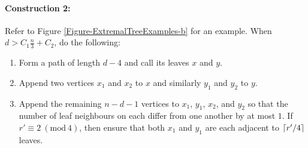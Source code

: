 \documentclass[12]{article}
\newcommand{\Mod}[1]{\ (\mathrm{mod}\ #1)}
\DeclarePairedDelimiter\ceil{\lceil}{\rceil}
\theoremstyle{definition}
\begin{document}
	\paragraph{Construction 2:} Refer to Figure \ref{Figure-ExtremalTreeExamples-b} for an example.  When $d > C_1\frac{n}{3} + C_2$, do the following:
	\begin{enumerate}
		\item Form a path of length $d-4$ and call its leaves $x$ and $y$.
		
		\item Append two vertices $x_1$ and $x_2$ to $x$ and similarly $y_1$ and $y_2$ to $y$.
		
		\item Append the remaining $n-d-1$ vertices to $x_1$, $y_1$, $x_2$, and $y_2$ so that the number of leaf neighbours on each differ from one another by at most $1$.  If $r' \equiv 2 \Mod{4}$, then ensure that both $x_1$ and $y_1$ are each adjacent to $\ceil{r'/4}$ leaves.
	\end{enumerate}
\end{document}
